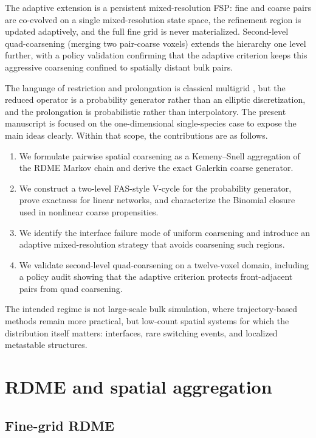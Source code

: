 \documentclass[11pt]{article}
\begin{document}
The adaptive extension is a persistent mixed-resolution FSP: fine and coarse
pairs are co-evolved on a single mixed-resolution state space, the refinement
region is updated adaptively, and the full fine grid is never materialized.
Second-level quad-coarsening (merging two pair-coarse voxels) extends the
hierarchy one level further, with a policy validation confirming that the
adaptive criterion keeps this aggressive coarsening confined to spatially
distant bulk pairs.

The language of restriction and prolongation is classical multigrid
\citep{Briggs2000,Trottenberg2001}, but the reduced operator is a probability
generator rather than an elliptic discretization, and the prolongation is
probabilistic rather than interpolatory. The present manuscript is focused on
the one-dimensional single-species case to expose the main ideas clearly.
Within that scope, the contributions are as follows.
\begin{enumerate}[itemsep=0.2em]
  \item We formulate pairwise spatial coarsening as a Kemeny--Snell
    aggregation of the RDME Markov chain \citep{kemeny_snell_1960,Buchholz1994}
    and derive the exact Galerkin coarse generator.
  \item We construct a two-level FAS-style V-cycle for the probability
    generator, prove exactness for linear networks, and characterize the
    Binomial closure used in nonlinear coarse propensities.
  \item We identify the interface failure mode of uniform coarsening and
    introduce an adaptive mixed-resolution strategy that avoids coarsening
    such regions.
  \item We validate second-level quad-coarsening on a twelve-voxel domain,
    including a policy audit showing that the adaptive criterion protects
    front-adjacent pairs from quad coarsening.
\end{enumerate}

The intended regime is not large-scale bulk simulation, where
trajectory-based methods remain more practical, but low-count spatial systems
for which the distribution itself matters: interfaces, rare switching events,
and localized metastable structures.

\section{RDME and spatial aggregation}

\subsection{Fine-grid RDME}
\end{document}
